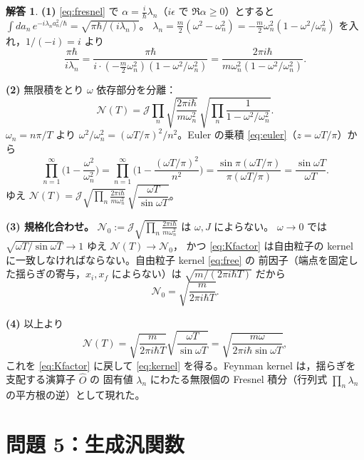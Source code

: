 \documentclass[dvipdfmx, uplatex]{jsarticle}
\theoremstyle{definition}
\newtheorem*{sol}{解答}
\begin{document}
\begin{sol}
\textbf{(1)} \eqref{eq:fresnel} で $\alpha=\frac{i}{\hbar}\lambda_n$（$i\epsilon$ で $\Re\alpha\ge0$）とすると
$\int da_n\,e^{-i\lambda_n a_n^2/\hbar}=\sqrt{\pi\hbar/(i\lambda_n)}$。
$\lambda_n=\frac{m}{2}(\omega^2-\omega_n^2)=-\frac{m}{2}\omega_n^2(1-\omega^2/\omega_n^2)$ を入れ，$1/(-i)=i$ より
\[
    \frac{\pi\hbar}{i\lambda_n}
    =\frac{\pi\hbar}{i\cdot(-\frac{m}{2}\omega_n^2)(1-\omega^2/\omega_n^2)}
    =\frac{2\pi i\hbar}{m\omega_n^2(1-\omega^2/\omega_n^2)}.
\]

\par\smallskip
\textbf{(2)} 無限積をとり $\omega$ 依存部分を分離：
\[
    \mathcal{N}(T)
    =\mathcal{J}\prod_n\sqrt{\frac{2\pi i\hbar}{m\omega_n^2}}\,
    \sqrt{\prod_n\frac{1}{1-\omega^2/\omega_n^2}}.
\]
$\omega_n=n\pi/T$ より $\omega^2/\omega_n^2=(\omega T/\pi)^2/n^2$。Euler の乗積 \eqref{eq:euler}（$z=\omega T/\pi$）から
\[
    \prod_{n=1}^\infty\Big(1-\frac{\omega^2}{\omega_n^2}\Big)
    =\prod_{n=1}^\infty\Big(1-\frac{(\omega T/\pi)^2}{n^2}\Big)
    =\frac{\sin\pi(\omega T/\pi)}{\pi(\omega T/\pi)}=\frac{\sin\omega T}{\omega T}.
\]
ゆえ $\mathcal{N}(T)=\mathcal{J}\sqrt{\prod_n\frac{2\pi i\hbar}{m\omega_n^2}}\,\sqrt{\dfrac{\omega T}{\sin\omega T}}$。

\par\smallskip
\textbf{(3) 規格化合わせ。}
$\mathcal{N}_0:=\mathcal{J}\sqrt{\prod_n\frac{2\pi i\hbar}{m\omega_n^2}}$ は $\omega,J$ によらない。
$\omega\to0$ では $\sqrt{\omega T/\sin\omega T}\to1$ ゆえ $\mathcal{N}(T)\to\mathcal{N}_0$，
かつ \eqref{eq:Kfactor} は自由粒子の kernel に一致しなければならない。自由粒子 kernel \eqref{eq:free} の
前因子（端点を固定した揺らぎの寄与，$x_i,x_f$ によらない）は $\sqrt{m/(2\pi i\hbar T)}$ だから
\[
    \mathcal{N}_0=\sqrt{\frac{m}{2\pi i\hbar T}}.
\]

\par\smallskip
\textbf{(4)} 以上より
\[
    \mathcal{N}(T)=\sqrt{\frac{m}{2\pi i\hbar T}}\sqrt{\frac{\omega T}{\sin\omega T}}
    =\sqrt{\frac{m\omega}{2\pi i\hbar\sin\omega T}},
\]
これを \eqref{eq:Kfactor} に戻して \eqref{eq:kernel} を得る。Feynman kernel は，揺らぎを支配する演算子 $\hat O$ の
固有値 $\lambda_n$ にわたる無限個の Fresnel 積分（行列式 $\prod_n\lambda_n$ の平方根の逆）として現れた。
\end{sol}

\section{問題 5：生成汎関数}
\end{document}
